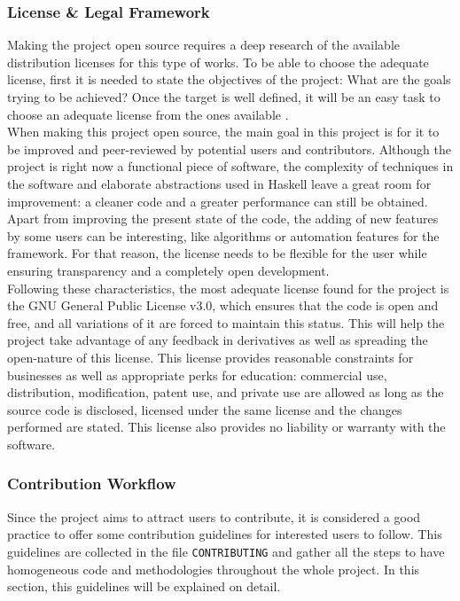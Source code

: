 \subsubsection{License \& Legal Framework}

Making the project open source requires a deep research of the available
distribution licenses for this type of works. To be able to choose the adequate
license, first it is needed to state the objectives of the project: What are the
goals trying to be achieved? Once the target is well defined, it will be an
easy task to choose an adequate license from the ones available
\cite{morin-2012-license}.\\

When making this project open source, the main goal in this project is
for it to be improved and peer-reviewed by potential users and contributors.
Although the project is right now a functional piece of software, the
complexity of techniques in the software and elaborate abstractions used in
Haskell leave a great room for improvement: a cleaner code and a greater
performance can still be obtained. Apart from improving the present state of
the code, the adding of new features by some users can be interesting, like
algorithms or automation features for the framework. For that reason, the
license needs to be flexible for the user while ensuring transparency and a
completely open development.\\

Following these characteristics, the most adequate license found for the
project is the GNU General Public License v3.0, which ensures that the code is
open and free, and all variations of it are forced to maintain this status.
This will help the project take advantage of any feedback in derivatives as
well as spreading the open-nature of this license. This license provides
reasonable constraints for businesses as well as appropriate perks for
education: commercial use, distribution, modification, patent use, and private
use are allowed as long as the source code is disclosed, licensed under the
same license and the changes performed are stated. This license also provides
no liability or warranty with the software.\\

\subsubsection{Contribution Workflow}

Since the project aims to attract users to contribute, it is considered a good
practice to offer some contribution guidelines for interested users to follow.
This guidelines are collected in the file \texttt{CONTRIBUTING} and gather all
the steps to have homogeneous code and methodologies throughout the whole
project. In this section, this guidelines will be explained on detail.\\

